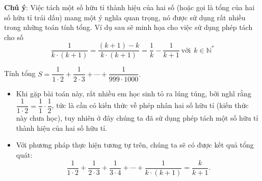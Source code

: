 \begin{note}{\textbf{Chú ý}}: Việc tách một số hữu tỉ thành hiệu của hai số (hoặc gọi là tổng của hai số hữu tỉ trái dấu) mang một ý nghĩa quan trọng, nó được sử dụng rất nhiều trong những toán tính tổng. Ví dụ sau sẽ minh họa cho việc sử dụng phép tách cho số 
	$$\dfrac{1}{k\cdot (k+1)}=\dfrac{\left(k+1\right)-k}{k\cdot (k+1)}=\dfrac{1}{k}-\dfrac{1}{k+1}\ \text{với}\ \ k\in\mathbb{N}^{*}$$
\end{note}

\begin{vd}%
Tính tổng $S=\dfrac{1}{1\cdot 2}+\dfrac{1}{2\cdot 3}+\cdots+\dfrac{1}{999\cdot 1000}.$
\end{vd}


\begin{nx}
\begin{itemize}
	\item Khi gặp bài toán này, rất nhiều em học sinh tỏ ra lúng túng, bởi nghĩ rằng $\dfrac{1}{1\cdot 2}=\dfrac{1}{1}\cdot \dfrac{1}{2}$, tức là cần có kiến thức về phép nhân hai số hữu tỉ (kiến thức này chưa học), tuy nhiên ở đây chúng ta đã sử dụng phép tách một số hữu tỉ thành hiệu của hai số hữu tỉ.
	\item Với phương pháp thực hiện tương tự trên, chúng ta sẽ có được kết quả tổng quát:
	$$\dfrac{1}{1\cdot 2}+\dfrac{1}{2\cdot 3}+\dfrac{1}{3\cdot 4}+\cdots+\dfrac{1}{k\cdot (k+1)}=\dfrac{k}{k+1}.$$
	
\end{itemize}
\end{nx}

